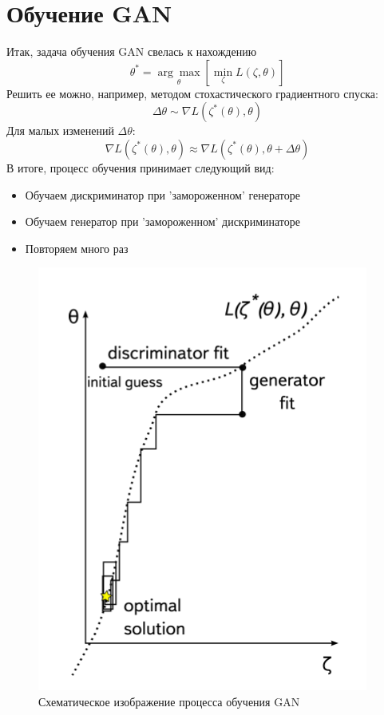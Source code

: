 \documentclass[a4paper]{article}
\begin{document}
	\section{Обучение GAN}
		Итак, задача обучения GAN свелась к нахождению
		$$ \theta^* = \underset{\theta}{\arg\max} \left[ \underset{\zeta}{\min} L(\zeta, \theta) \right] $$
		Решить ее можно, например, методом стохастического градиентного спуска:
		$$ \Delta \theta \sim \nabla L(\zeta^*(\theta), \theta)$$
		Для малых изменений $\Delta \theta$:
		$$ \nabla L(\zeta^*(\theta), \theta) \approx \nabla L(\zeta^*(\theta), \theta + \Delta \theta) $$
		В итоге, процесс обучения принимает следующий вид:
		\begin{itemize}
				\item Обучаем дискриминатор при 'замороженном' генераторе
				\item Обучаем генератор при 'замороженном' дискриминаторе
				\item Повторяем много раз
		\end{itemize}
		\begin{figure}
			\begin{center}
				\includegraphics[width=0.4\linewidth]{gan-training}
			\end{center}
			\caption{Схематическое изображение процесса обучения GAN}
		\end{figure}
\end{document}
